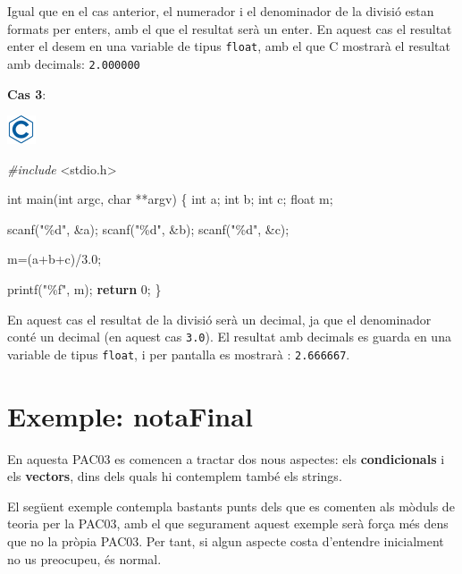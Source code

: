 \documentclass[
]{book}
\newenvironment{Shaded}{\begin{snugshade}}{\end{snugshade}}
\newcommand{\ControlFlowTok}[1]{\textcolor[rgb]{0.13,0.29,0.53}{\textbf{#1}}}
\newcommand{\DataTypeTok}[1]{\textcolor[rgb]{0.13,0.29,0.53}{#1}}
\newcommand{\DecValTok}[1]{\textcolor[rgb]{0.00,0.00,0.81}{#1}}
\newcommand{\FloatTok}[1]{\textcolor[rgb]{0.00,0.00,0.81}{#1}}
\newcommand{\ImportTok}[1]{#1}
\newcommand{\NormalTok}[1]{#1}
\newcommand{\PreprocessorTok}[1]{\textcolor[rgb]{0.56,0.35,0.01}{\textit{#1}}}
\newcommand{\StringTok}[1]{\textcolor[rgb]{0.31,0.60,0.02}{#1}}
\begin{document}
Igual que en el cas anterior, el numerador i el denominador de la divisió estan formats per enters, amb el que el resultat serà un enter. En aquest cas el resultat enter el desem en una variable de tipus \texttt{float}, amb el que C mostrarà el resultat amb decimals: \texttt{2.000000}

\textbf{Cas 3}:

\includegraphics{./img/c.png}

\begin{Shaded}
\begin{Highlighting}[]
\PreprocessorTok{\#include }\ImportTok{\textless{}stdio.h\textgreater{}}

\DataTypeTok{int}\NormalTok{ main(}\DataTypeTok{int}\NormalTok{ argc, }\DataTypeTok{char}\NormalTok{ **argv) \{}
    \DataTypeTok{int}\NormalTok{ a;}
    \DataTypeTok{int}\NormalTok{ b;}
    \DataTypeTok{int}\NormalTok{ c;}
    \DataTypeTok{float}\NormalTok{ m;}

\NormalTok{    scanf(}\StringTok{"\%d"}\NormalTok{, \&a);}
\NormalTok{    scanf(}\StringTok{"\%d"}\NormalTok{, \&b);}
\NormalTok{    scanf(}\StringTok{"\%d"}\NormalTok{, \&c);}

\NormalTok{    m=(a+b+c)/}\FloatTok{3.0}\NormalTok{;}

\NormalTok{    printf(}\StringTok{"\%f"}\NormalTok{, m);}
    \ControlFlowTok{return} \DecValTok{0}\NormalTok{;}
\NormalTok{\}}
\end{Highlighting}
\end{Shaded}

En aquest cas el resultat de la divisió serà un decimal, ja que el denominador conté un decimal (en aquest cas \texttt{3.0}). El resultat amb decimals es guarda en una variable de tipus \texttt{float}, i per pantalla es mostrarà : \texttt{2.666667}.

\hypertarget{exemple-notafinal}{%
\section{Exemple: notaFinal}\label{exemple-notafinal}}

En aquesta PAC03 es comencen a tractar dos nous aspectes: els \textbf{condicionals} i els \textbf{vectors}, dins dels quals hi contemplem també els strings.

El següent exemple contempla bastants punts dels que es comenten als mòduls de teoria per la PAC03, amb el que segurament aquest exemple serà força més dens que no la pròpia PAC03. Per tant, si algun aspecte costa d'entendre inicialment no us preocupeu, és normal.
\end{document}
